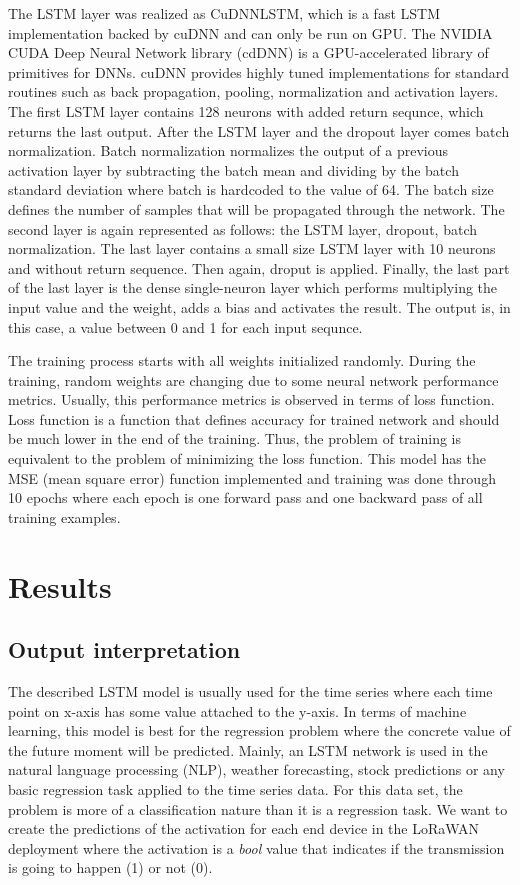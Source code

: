 The LSTM layer was realized as CuDNNLSTM, which is a fast LSTM implementation backed by cuDNN and can only be run on GPU.
The NVIDIA CUDA Deep Neural Network library (cdDNN) is a GPU-accelerated library of primitives for DNNs. cuDNN provides highly tuned implementations for standard routines such as back propagation, pooling, normalization and activation layers.
The first LSTM layer contains 128 neurons with added return sequnce, which returns the last output.
After the LSTM layer and the dropout layer comes batch normalization. 
Batch normalization normalizes the output of a previous activation layer by subtracting the batch mean and dividing by the batch standard deviation where batch is hardcoded to the value of 64.
The batch size defines the number of samples that will be propagated through the network.
The second layer is again represented as follows: the LSTM layer, dropout, batch normalization.
The last layer contains a small size LSTM layer with 10 neurons and without return sequence. 
Then again, droput is applied. 
Finally, the last part of the last layer is the dense single-neuron layer which performs multiplying the input value and the weight, adds a bias and activates the result.
The output is, in this case, a value between 0 and 1 for each input sequnce. 

The training process starts with all weights initialized randomly. 
During the training, random weights are changing due to some neural network performance metrics. 
Usually, this performance metrics is observed in terms of loss function. 
Loss function is a function that defines accuracy for trained network and should be much lower in the end of the training.
Thus, the problem of training is equivalent to the problem of minimizing the loss function. 
This model has the MSE (mean square error) function implemented and training was done through 10 epochs where each epoch is one forward pass and one backward pass of all training examples.

\section{Results}
\subsection{Output interpretation}
The described LSTM model is usually used for the time series where each time point on x-axis has some value attached to the y-axis. 
In terms of machine learning, this model is best for the regression problem where the concrete value of the future moment will be predicted.
Mainly, an LSTM network is used in the natural language processing (NLP), weather forecasting, stock predictions or any basic regression task applied to the time series data. 
For this data set, the problem is more of a classification nature than it is a regression task. 
We want to create the predictions of the activation for each end device in the LoRaWAN deployment where the activation is a \textit{bool} value that indicates if the transmission is going to happen (1) or not (0).

